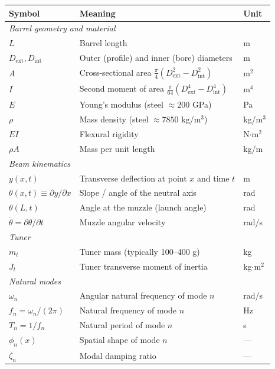 \documentclass[12pt,a4paper]{article}
\begin{document}
	\begin{center}
		\renewcommand{\arraystretch}{1.12}
		\begin{tabular}{l l l}
			\toprule
			Symbol & Meaning & Unit \\
			\midrule
			\multicolumn{3}{l}{\emph{Barrel geometry and material}} \\
			$L$ & Barrel length & m \\
			$D_\text{ext}, D_\text{int}$ & Outer (profile) and inner (bore) diameters & m \\
			$A$ & Cross-sectional area $\tfrac{\pi}{4}(D_\text{ext}^2 - D_\text{int}^2)$ & m$^2$ \\
			$I$ & Second moment of area $\tfrac{\pi}{64}(D_\text{ext}^4 - D_\text{int}^4)$ & m$^4$ \\
			$E$ & Young's modulus (steel $\approx 200$ GPa) & Pa \\
			$\rho$ & Mass density (steel $\approx 7850$ kg/m$^3$) & kg/m$^3$ \\
			$EI$ & Flexural rigidity & N$\cdot$m$^2$ \\
			$\rho A$ & Mass per unit length & kg/m \\
			\midrule
			\multicolumn{3}{l}{\emph{Beam kinematics}} \\
			$y(x,t)$ & Transverse deflection at point $x$ and time $t$ & m \\
			$\theta(x,t) \equiv \partial y/\partial x$ & Slope / angle of the neutral axis & rad \\
			$\theta(L,t)$ & Angle at the muzzle (launch angle) & rad \\
			$\dot\theta = \partial \theta/\partial t$ & Muzzle angular velocity & rad/s \\
			\midrule
			\multicolumn{3}{l}{\emph{Tuner}} \\
			$m_t$ & Tuner mass (typically 100--400 g) & kg \\
			$J_t$ & Tuner transverse moment of inertia & kg$\cdot$m$^2$ \\
			\midrule
			\multicolumn{3}{l}{\emph{Natural modes}} \\
			$\omega_n$ & Angular natural frequency of mode $n$ & rad/s \\
			$f_n = \omega_n/(2\pi)$ & Natural frequency of mode $n$ & Hz \\
			$T_n = 1/f_n$ & Natural period of mode $n$ & s \\
			$\phi_n(x)$ & Spatial shape of mode $n$ & --- \\
			$\zeta_n$ & Modal damping ratio & --- \\

\end{tabular}
\end{center}
\end{document}
